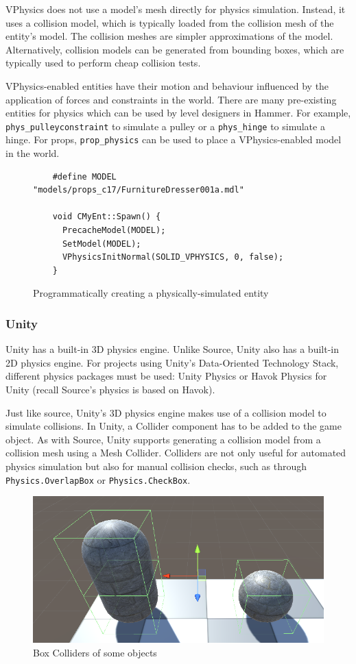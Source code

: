 \documentclass[a4paper, 12pt]{scrartcl}
\begin{document}
VPhysics does not use a model's mesh directly for physics simulation. Instead, it uses a collision model, which is typically loaded from the collision mesh of the entity's model. The collision meshes are simpler approximations of the model. Alternatively, collision models can be generated from bounding boxes, which are typically used to perform cheap collision tests.

VPhysics-enabled entities have their motion and behaviour influenced by the application of forces and constraints in the world. There are many pre-existing entities for physics which can be used by level designers in Hammer. For example, \texttt{phys\_pulleyconstraint} to simulate a pulley or a \texttt{phys\_hinge} to simulate a hinge. For props, \texttt{prop\_physics} can be used to place a VPhysics-enabled model in the world.

\begin{figure}[!htb]
  \begin{verbatim}
    #define MODEL "models/props_c17/FurnitureDresser001a.mdl"

    void CMyEnt::Spawn() {
      PrecacheModel(MODEL);
      SetModel(MODEL);
      VPhysicsInitNormal(SOLID_VPHYSICS, 0, false);
    }
  \end{verbatim}
  \caption{Programmatically creating a physically-simulated entity}
  \label{fig:source_physics_ent}
\end{figure}

\subsubsection{Unity}
Unity has a built-in 3D physics engine. Unlike Source, Unity also has a built-in 2D physics engine. For projects using Unity's Data-Oriented Technology Stack, different physics packages must be used: Unity Physics or Havok Physics for Unity (recall Source's physics is based on Havok).

Just like source, Unity's 3D physics engine makes use of a collision model to simulate collisions. In Unity, a Collider component has to be added to the game object. As with Source, Unity supports generating a collision model from a collision mesh using a Mesh Collider. Colliders are not only useful for automated physics simulation but also for manual collision checks, such as through \texttt{Physics.OverlapBox} or \texttt{Physics.CheckBox}.

\begin{figure}[!htb]
  \centering
  \includegraphics[width=0.66\linewidth]{images/unity_colliders.png}
  \caption{Box Colliders of some objects}
  \label{fig:unity_colliders}
\end{figure}
\end{document}

